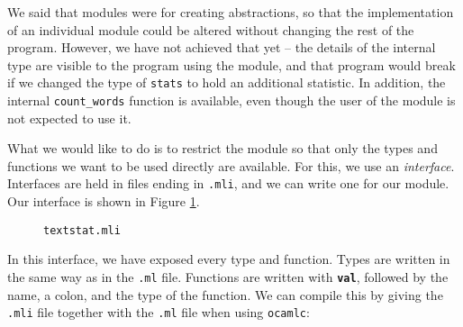 \documentclass[]{book}
\begin{document}
We said that modules were for creating abstractions, so that the implementation of an individual module could be altered without changing the rest of the program. However, we have not achieved that yet -- the details of the internal type are visible to the program using the module, and that program would break if we changed the type of \texttt{stats} to hold an additional statistic. In addition, the internal \texttt{count\_words} function is available, even though the user of the module is not expected to use it.

What we would like to do is to restrict the module so that only the types and functions we want to be used directly are available. For this, we use an \textit{interface}. Interfaces are held in files ending in \texttt{.mli}, and we can write one for our module. Our interface is shown in Figure \ref{textstat.mli}.

\begin{figure}
\begin{center}
\end{center}
\caption{\small\texttt{textstat.mli}}
\label{textstat.mli}
\end{figure}


In this interface, we have exposed every type and function. Types are written in the same way as in the \texttt{.ml} file. Functions are written with \texttt{\textbf{val}}, followed by the name, a colon, and the type of the function. We can compile this by giving the\! \texttt{.mli} file together with the\! \texttt{.ml} file when using \texttt{ocamlc}:
\end{document}

